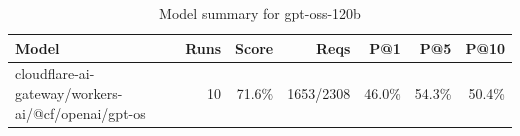 \begin{table}[htbp]
\centering
\begin{tabular}{lrrrrrr}
\toprule
Model & Runs & Score & Reqs & P@1 & P@5 & P@10 \\
\midrule
cloudflare-ai-gateway/workers-ai/@cf/openai/gpt-os & 10 & 71.6\% & 1653/2308 & 46.0\% & 54.3\% & 50.4\% \\
\bottomrule
\end{tabular}
\caption{Model summary for gpt-oss-120b}
\end{table}
